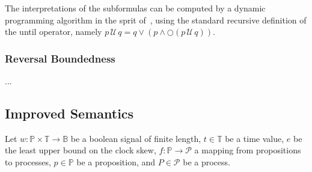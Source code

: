 \documentclass[envcountsame, runningheads]{llncs}
\newcommand{\rednote}[2][]{{\todo[color=magenta!80,size=\footnotesize,#1]{\normalcolor\normalfont#2}}}
\newcommand{\B}{\mathbb{B}}
\newcommand{\LTLo}{\ensuremath{\bigcirc}}
\let\LTLnext\LTLo
\def\until{\,\mathcal{U}\,}
\newcommand{\?}{\text{?}}
\begin{document}
	The interpretations of the subformulas can be computed by a dynamic programming algorithm in the sprit of~\cite{Havelund2002}, using the standard recursive definition of the until operator, namely $p \until q = q \lor (p \land \LTLnext (p \until q))$.
	
	
%	
		

		
	\subsubsection*{Reversal Boundedness}
	...
	
	\newpage
	
	\subsection*{Improved Semantics}
	Let $w : \mathbb{P} \times \mathbb{T} \to \B$ be a boolean signal of finite length, $t \in \mathbb{T}$ be a time value, $e$ be the least upper bound on the clock skew, $f : \mathbb{P} \to \mathcal{P}$ a mapping from propositions to processes, $p \in \mathbb{P}$ be a proposition, and $P \in \mathcal{P}$ be a process.
	
\end{document}

